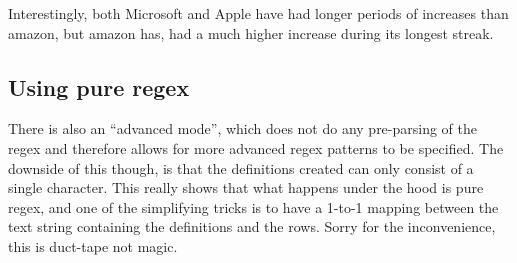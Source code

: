\documentclass[]{article}
\newenvironment{Shaded}{\begin{snugshade}}{\end{snugshade}}
\newcommand{\CommentTok}[1]{\textcolor[rgb]{0.56,0.35,0.01}{\textit{#1}}}
\newcommand{\DataTypeTok}[1]{\textcolor[rgb]{0.13,0.29,0.53}{#1}}
\newcommand{\KeywordTok}[1]{\textcolor[rgb]{0.13,0.29,0.53}{\textbf{#1}}}
\newcommand{\NormalTok}[1]{#1}
\newcommand{\OperatorTok}[1]{\textcolor[rgb]{0.81,0.36,0.00}{\textbf{#1}}}
\newcommand{\StringTok}[1]{\textcolor[rgb]{0.31,0.60,0.02}{#1}}
\begin{document}
\begin{Shaded}
\end{Shaded}

Interestingly, both Microsoft and Apple have had longer periods of
increases than amazon, but amazon has, had a much higher increase during
its longest streak.

\hypertarget{using-pure-regex}{%
\subsection{Using pure regex}\label{using-pure-regex}}

There is also an ``advanced mode'', which does not do any pre-parsing of
the regex and therefore allows for more advanced regex patterns to be
specified. The downside of this though, is that the definitions created
can only consist of a single character. This really shows that what
happens under the hood is pure regex, and one of the simplifying tricks
is to have a 1-to-1 mapping between the text string containing the
definitions and the rows. Sorry for the inconvenience, this is duct-tape
not magic.
\end{document}
